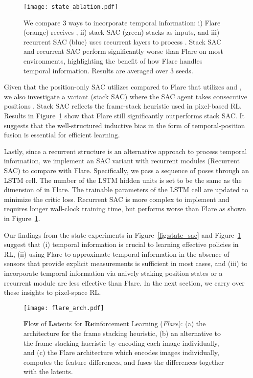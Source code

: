 \documentclass{article} \usepackage{iclr2021_conference,times}
\begin{document}
\begin{figure}[h]
\begin{center}
\centering
\texttt{[image: state\_ablation.pdf]}
\end{center}
\small
\vspace{-3mm}
\caption{We compare 3 ways to incorporate temporal information: i) Flare (orange) receives , 
ii) stack SAC (green) stacks  as inputs, and iii) recurrent SAC (blue) uses recurrent layers to process . Stack SAC and recurrent SAC perform significantly worse than Flare on most environments, highlighting the benefit of how Flare handles temporal information. Results are averaged over 3 seeds.
}\label{fig:state_ablation}
\vspace{-3mm}
\end{figure}


Given that the position-only SAC utilizes  compared to Flare that utilizes  and , we also investigate a variant (stack SAC) where the SAC agent takes consecutive positions 
. Stack SAC reflects the frame-stack heuristic used in pixel-based RL. Results in Figure~\ref{fig:state_ablation} show that Flare still significantly outperforms stack SAC. It suggests that the well-structured inductive bias in the form of temporal-position fusion is essential for efficient learning.


Lastly, since a recurrent structure is an alternative approach to process temporal information, we implement an SAC variant with recurrent modules (Recurrent SAC) to compare with Flare. Specifically, we pass a sequence of poses  through an LSTM cell. The number of the LSTM hidden units  is set to be the same as the dimension of  in Flare. 
The trainable parameters of the LSTM cell are updated to minimize the critic loss. Recurrent SAC is more complex to implement and requires longer wall-clock training time, but performs worse than Flare as shown in Figure~\ref{fig:state_ablation}.

Our findings from the state experiments in Figure~\ref{fig:state_sac} and Figure~\ref{fig:state_ablation} suggest that (i) temporal information is crucial to learning effective policies in RL,  (ii) using Flare to approximate temporal information in the absence of sensors that provide explicit measurements is sufficient in most cases, and (iii) to incorporate temporal information via naively staking position states or a recurrent module are less effective than Flare. In the next section, we carry over these insights to pixel-space RL.    
\begin{figure}[t]
\begin{center}
\centering
\texttt{[image: flare\_arch.pdf]}
\end{center}
\caption{{\bf F}low of {\bf La}tents for {\bf Re}inforcement Learning (\emph{Flare}): (a) the architecture for the frame stacking heuristic, (b) an alternative to the frame stacking hueristic by encoding each image individually, and (c) the Flare architecture which encodes images individually, computes the feature differences, and fuses the differences together with the latents.}\label{fig:flare}
\end{figure}
\end{document}
